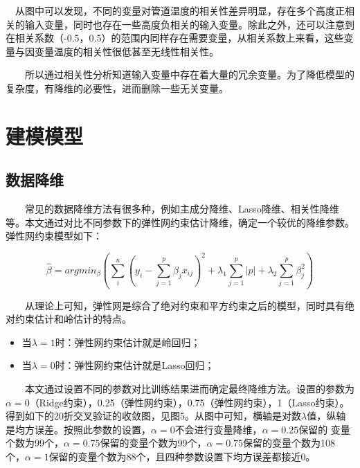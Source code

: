 \documentclass[
]{article}
\begin{document}
 从图中可以发现，不同的变量对管道温度的相关性差异明显，存在多个高度正相关的输入变量，同时也存在一些高度负相关的输入变量。除此之外，还可以注意到在相关系数（-0.5，0.5）的范围内同样存在需要变量，从相关系数上来看，这些变量与因变量温度的相关性很低甚至无线性相关性。

  所以通过相关性分析知道输入变量中存在着大量的冗余变量。为了降低模型的复杂度，有降维的必要性，进而删除一些无关变量。

\hypertarget{ux5efaux6a21ux6a21ux578b}{%
\section{建模模型}\label{ux5efaux6a21ux6a21ux578b}}

\hypertarget{ux6570ux636eux964dux7ef4}{%
\subsection{数据降维}\label{ux6570ux636eux964dux7ef4}}

  常见的数据降维方法有很多种，例如主成分降维、Lasso降维、相关性降维等。本文通过对比不同参数下的弹性网约束估计降维，确定一个较优的降维参数。弹性网约束模型如下：

\[\hat{\beta}= arg min_{\beta}\left(\sum_{i}^n \left(y_i-\sum_{j=1}^p\beta_jx_{ij} \right)^2+\lambda_1\sum_{j=1}^p|p|+\lambda_2\sum_{j=1}^p\beta_j^2\right)\]

  从理论上可知，弹性网是综合了绝对约束和平方约束之后的模型，同时具有绝对约束估计和岭估计的特点。

\begin{itemize}
\item
  当\(\lambda=1\)时：弹性网约束估计就是岭回归；
\item
  当\(\lambda=0\)时：弹性网约束估计就是Lasso回归；
\end{itemize}

  本文通过设置不同的参数对比训练结果进而确定最终降维方法。设置的参数为\(\alpha=0\)（Ridge约束），0.25（弹性网约束），0.75（弹性网约束），1（Lasso约束）。得到如下的20折交叉验证的收敛图，见图5。从图中可知，横轴是对数\(\lambda\)值，纵轴是均方误差。按照此参数的设置，\(\alpha=0\)不会进行变量降维，\(\alpha=0.25\)保留的
变量个数为99个，\(\alpha=0.75\)保留的变量个数为99个，\(\alpha=0.75\)保留的变量个数为108个，\(\alpha=1\)保留的变量个数为88个，且四种参数设置下均方误差都接近0。
\end{document}
